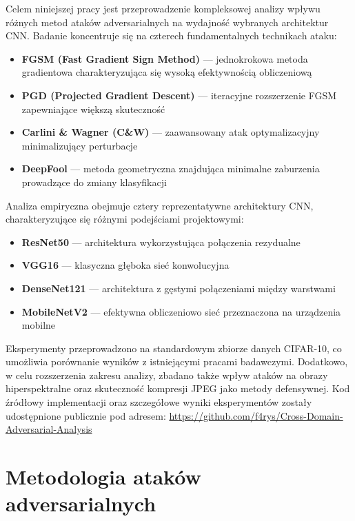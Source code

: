 \documentclass[12pt]{article}
\begin{document}
Celem niniejszej pracy jest przeprowadzenie kompleksowej analizy wpływu różnych metod ataków adversarialnych na wydajność wybranych architektur CNN. Badanie koncentruje się na czterech fundamentalnych technikach ataku:

\begin{itemize}
    \item \textbf{FGSM (Fast Gradient Sign Method)} \cite{goodfellow2014explaining} --- jednokrokowa metoda gradientowa charakteryzująca się wysoką efektywnością obliczeniową
    \item \textbf{PGD (Projected Gradient Descent)} \cite{madry2017towards} --- iteracyjne rozszerzenie FGSM zapewniające większą skuteczność
    \item \textbf{Carlini \& Wagner (C\&W)} \cite{carlini2017towards} --- zaawansowany atak optymalizacyjny minimalizujący perturbacje
    \item \textbf{DeepFool} \cite{moosavi2016deepfool} --- metoda geometryczna znajdująca minimalne zaburzenia prowadzące do zmiany klasyfikacji
\end{itemize}

Analiza empiryczna obejmuje cztery reprezentatywne architektury CNN, charakteryzujące się różnymi podejściami projektowymi:

\begin{itemize}
    \item \textbf{ResNet50} --- architektura wykorzystująca połączenia rezydualne
    \item \textbf{VGG16} --- klasyczna głęboka sieć konwolucyjna
    \item \textbf{DenseNet121} --- architektura z gęstymi połączeniami między warstwami
    \item \textbf{MobileNetV2} --- efektywna obliczeniowo sieć przeznaczona na urządzenia mobilne
\end{itemize}

Eksperymenty przeprowadzono na standardowym zbiorze danych CIFAR-10, co umożliwia porównanie wyników z istniejącymi pracami badawczymi. Dodatkowo, w celu rozszerzenia zakresu analizy, zbadano także wpływ ataków na obrazy hiperspektralne oraz skuteczność kompresji JPEG jako metody defensywnej. Kod źródłowy implementacji oraz szczegółowe wyniki eksperymentów zostały udostępnione publicznie pod adresem: \url{https://github.com/f4rys/Cross-Domain-Adversarial-Analysis}

\section{Metodologia ataków adversarialnych}
\end{document}
